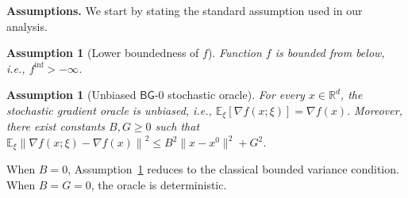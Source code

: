 \documentclass[letter,11pt]{article}
\newtheorem{assumption}[]{Assumption}
\newcommand{\E}{\mathbb{E}}
\newcommand{\R}{\mathbb{R}}
\begin{document}
\textbf{Assumptions.} We start by stating the standard assumption used in our analysis.
\begin{assumption}[Lower boundedness of $f$]
    \label{as:lower}
    Function $f$ is bounded from below, i.e., $f^{\inf}>-\infty$.
\end{assumption}
\begin{assumption}[Unbiased $\mathsf{BG}$-0 stochastic oracle]
    \label{as:bg0_oracle}
    For every $x\in\R^d$, the stochastic gradient oracle is unbiased, i.e., $\E_\xi[\nabla f(x;\xi)]=\nabla f(x).$ Moreover, there exist constants $B,G\ge0$ such that $\E_\xi \left\| \nabla f(x;\xi)-\nabla f(x) \right\|^2 \le B^2\|x-x^0\|^2+G^2$.
\end{assumption}
When $B=0$, Assumption~\ref{as:bg0_oracle} reduces to the classical bounded variance condition. When $B=G=0$, the oracle is deterministic.
\end{document}
